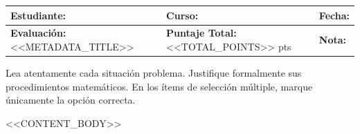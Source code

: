 \documentclass[11pt,letterpaper]{article}
\begin{document}
\noindent
\begin{tabularx}{\textwidth}{|X|l|l|}
\hline
\textbf{Estudiante:} & \textbf{Curso:} & \textbf{Fecha:} \\
\hline
\textbf{Evaluación:} <<METADATA_TITLE>> & \textbf{Puntaje Total:} <<TOTAL_POINTS>> pts & \textbf{Nota:} \\
\hline
\end{tabularx}

\vspace{0.4cm}

\begin{cajainstruccion}
Lea atentamente cada situación problema. Justifique formalmente sus procedimientos matemáticos. En los ítems de selección múltiple, marque únicamente la opción correcta.
\end{cajainstruccion}

\vspace{0.4cm}

<<CONTENT_BODY>>
\end{document}

